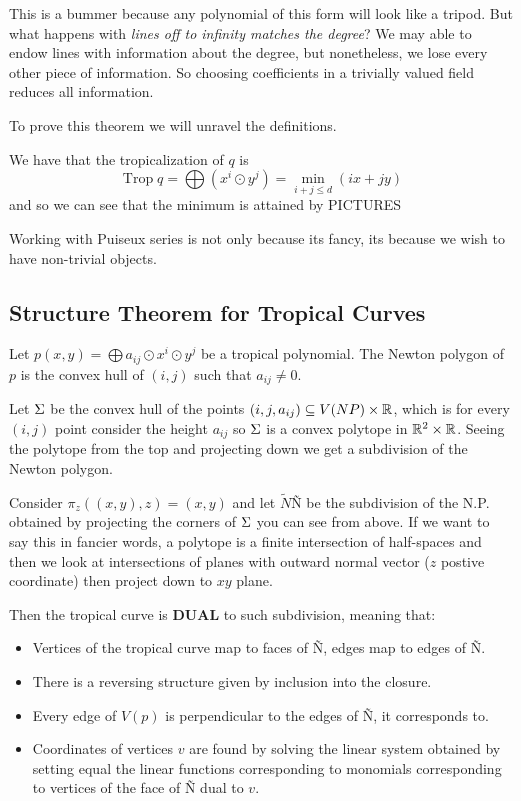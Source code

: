 \documentclass[12pt]{memoir}
\DeclareMathOperator{\Trop}{Trop}
\begin{document}
This is a bummer because any polynomial of this form will look like a tripod. But what happens with \emph{lines off to infinity matches the degree}? We may able to endow lines with information about the degree, but nonetheless, we lose every other piece of information. So choosing coefficients in a trivially valued field reduces all information.\par 
To prove this theorem we will unravel the definitions.

\begin{ptcbp}
We have that the tropicalization of $q$ is 
$$\Trop q=\bigoplus(x^i\odot y^j)=\min_{i+j\leq d}(ix+jy)$$
and so we can see that the minimum is attained by PICTURES
\end{ptcbp}

Working with Puiseux series is not only because its fancy, its because we wish to have non-trivial objects.

\subsection{Structure Theorem for Tropical Curves}

Let $p(x,y)=\bigoplus a_{ij}\odot x^i\odot y^j$ be a tropical polynomial. The Newton polygon of $p$ is the convex hull of $(i,j)$ such that $a_{ij}\neq 0$.\par 
Let $\Sigma$ be the convex hull of the points $(i,j,a_{ij})\subseteq V(NP)\times\mathbb{R}$, which is for every $(i,j)$ point consider the height $a_{ij}$ so $\Sigma$ is a convex polytope in $\mathbb{R}^2\times\mathbb{R}$. Seeing the polytope from the top and projecting down we get a subdivision of the Newton polygon.\par 
Consider $\pi_z((x,y),z)=(x,y)$ and let $\tilde{N}$\~N be the subdivision of the N.P. obtained by projecting the corners of $\Sigma$ you can see from above.
If we want to say this in fancier words, a polytope is a finite intersection of half-spaces and then we look at intersections of planes with outward normal vector ($z$ postive coordinate) then project down to $xy$ plane.\par 
Then the tropical curve is \textbf{DUAL} to such subdivision, meaning that:
\begin{itemize}
    \item Vertices of the tropical curve map to faces of \~N, edges map to edges of \~N.
    \item There is a reversing structure given by inclusion into the closure.
    \item Every edge of $V(p)$ is perpendicular to the edges of \~N, it corresponds to.
    \item Coordinates of vertices $v$ are found by solving the linear system obtained by setting equal the linear functions corresponding to monomials corresponding to vertices of the face of \~N dual to $v$.
\end{itemize}
\end{document}
